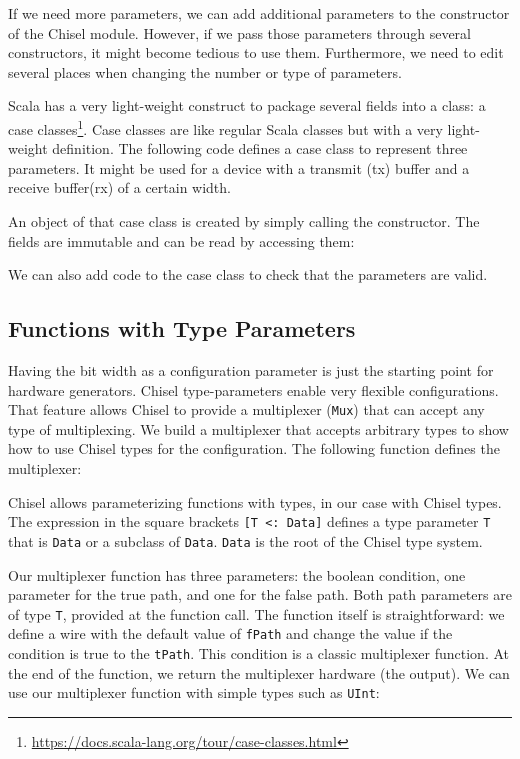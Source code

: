 \documentclass[%
    10pt,
    headinclude, footexclude,
    openright, %
    notitlepage,
    cleardoubleempty,
    headsepline,
    pointlessnumbers,
    bibtotoc, idxtotoc,
    ]{scrbook}
\newcommand{\code}[1]{{\lstinline[basicstyle=\small\ttfamily]{#1}}}
\newcommand{\myref}[2]{\href{#1}{#2}}
\renewcommand{\myref}[2]{{#2}{\footnote{\url{#1}}}}
\begin{document}
If we need more parameters, we can add additional parameters to the constructor
of the Chisel module. However, if we pass those parameters through several constructors,
it might become tedious to use them. Furthermore, we need to edit several places when changing the number or type of
parameters.

Scala has a very light-weight construct to package several fields into a class:
a \myref{https://docs.scala-lang.org/tour/case-classes.html}{case classes}.
Case classes are like regular Scala classes but with a very light-weight definition.
The following code defines a case class to represent three parameters. It might be used for
a device with a transmit (tx) buffer and a receive buffer(rx) of a certain width.


\noindent An object of that case class is created by simply calling the constructor.
The fields are immutable and can be read by accessing them:


\noindent We can also add code to the case class to check that the parameters
are valid.


\subsection{Functions with Type Parameters}

Having the bit width as a configuration parameter is just the starting point for
hardware generators. Chisel type-parameters enable very flexible configurations.
That feature allows Chisel to provide a multiplexer (\code{Mux}) that
can accept any type of multiplexing.
We build a multiplexer that accepts arbitrary types to show how to use Chisel
types for the configuration. The following function defines the multiplexer:


Chisel allows parameterizing functions with types, in our case with Chisel
types. The expression in the square brackets \code{[T <: Data]} defines
a type parameter \code{T} that is \code{Data} or a subclass of \code{Data}.
\code{Data} is the root of the Chisel type system.

Our multiplexer function has three parameters: the boolean condition,
one parameter for the true path, and one for the false path.
Both path parameters are of type \code{T}, 
provided at the function call. The function itself is straightforward:
we define a wire with the default value of \code{fPath} and
change the value if the condition is true to the \code{tPath}.
This condition is a classic multiplexer function.
At the end of the function, we return the multiplexer hardware (the output).
We can use our multiplexer function with simple types such as
\code{UInt}:
\end{document}
